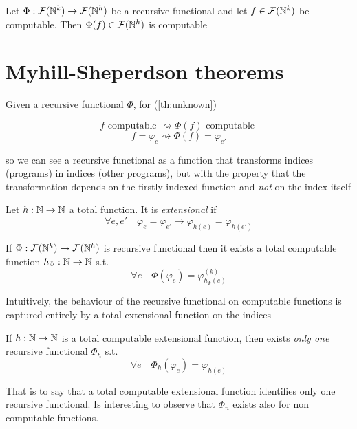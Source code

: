 \begin{theorem}\label{th:unknown}
  Let $\Phi : \mathcal{F}(\mathbb{N}^k) \to \mathcal{F}(\mathbb{N}^h)$
  be a recursive functional and let $f \in \mathcal{F}(\mathbb{N}^k)$ be
  computable. Then $\Phi(f) \in \mathcal{F}(\mathbb{N}^h)$ is computable
\end{theorem}

\section{Myhill-Sheperdson theorems}
Given a recursive functional $\Phi$, for (\ref{th:unknown})

\[
  f \mbox{ computable } \rightsquigarrow \Phi(f) \mbox{ computable }
\]
\[
  f = \varphi_e \rightsquigarrow \Phi(f) = \varphi_{e'}
\]

so we can see a recursive functional as a function that transforms
indices (programs) in indices (other programs), but with the property
that the transformation depends on the firstly indexed function and
\emph{not} on the index itself

\begin{definition}
  Let $h : \mathbb{N} \to \mathbb{N}$ a total function. It is \emph{extensional} if
  \[
    \forall e,e' \quad \varphi_e = \varphi_{e'} \to
    \varphi_{h(e)} = \varphi_{h(e')}
  \]
\end{definition}

\begin{theorem}
  If $\Phi : \mathcal{F}(\mathbb{N}^k) \to \mathcal{F}(\mathbb{N}^h)$ is
  recursive functional then it exists a total computable function
  $h_\Phi : \mathbb{N} \to \mathbb{N}$ s.t.
  \[
    \forall e \quad \Phi(\varphi_e) = \varphi_{h_\Phi(e)}^{(k)}
  \]
\end{theorem}

Intuitively, the behaviour of the recursive functional on computable
functions is captured entirely by a total extensional function on the
indices

\begin{theorem}\label{th:myhill-shepherdson2}
  If $h : \mathbb{N} \to \mathbb{N}$ is a total computable extensional function, then
  exists \emph{only one} recursive functional $\Phi_h$ s.t.
  \[
    \forall e \quad \Phi_h(\varphi_e) = \varphi_{h(e)}
  \]
\end{theorem}
That is to say that a total computable extensional function identifies
only one recursive functional.  Is interesting to observe that
$\Phi_n$ exists also for non computable functions.

